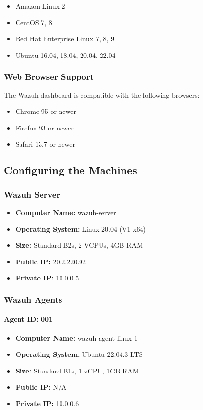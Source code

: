 \begin{itemize}
\item Amazon Linux 2
\item CentOS 7, 8
\item Red Hat Enterprise Linux 7, 8, 9
\item Ubuntu 16.04, 18.04, 20.04, 22.04
\end{itemize}

\subsubsection{Web Browser Support}

The Wazuh dashboard is compatible with the following browsers:

\begin{itemize}
\item Chrome 95 or newer
\item Firefox 93 or newer
\item Safari 13.7 or newer
\end{itemize}

\subsection{Configuring the Machines}

\subsubsection{Wazuh Server}
\begin{itemize}
    \item \textbf{Computer Name:} wazuh-server
    \item \textbf{Operating System:} Linux 20.04 (V1 x64)
    \item \textbf{Size:} Standard B2s, 2 VCPUs, 4GB RAM
    \item \textbf{Public IP:} 20.2.220.92
    \item \textbf{Private IP:} 10.0.0.5
\end{itemize}

\subsubsection{Wazuh Agents}
\label{installed-agents}
\paragraph*{Agent ID: 001}
\begin{itemize}
    \item \textbf{Computer Name:} wazuh-agent-linux-1
    \item \textbf{Operating System:} Ubuntu 22.04.3 LTS
    \item \textbf{Size:} Standard B1s, 1 vCPU, 1GB RAM
    \item \textbf{Public IP:} N/A
    \item \textbf{Private IP:} 10.0.0.6
\end{itemize}

